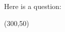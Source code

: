 \documentclass{article}
\begin{document}
Here is a question:

\vspace{10pt} %
\noindent %
\framebox(300,50){} %

\vspace{10pt}
\noindent
\framebox[\linewidth]{\raisebox{0pt}[50pt][50pt]{}} %
\end{document}
